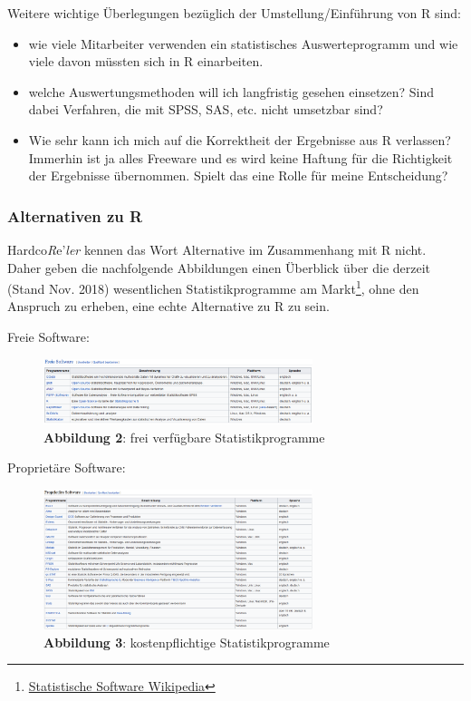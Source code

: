 \documentclass[]{article}
\providecommand{\tightlist}{%
  \setlength{\itemsep}{0pt}\setlength{\parskip}{0pt}}
\let\rmarkdownfootnote\footnote%
\def\footnote{\protect\rmarkdownfootnote}
\begin{document}
Weitere wichtige Überlegungen bezüglich der Umstellung/Einführung von R
sind:

\begin{itemize}
\tightlist
\item
  wie viele Mitarbeiter verwenden ein statistisches Auswerteprogramm und
  wie viele davon müssten sich in R einarbeiten.
\item
  welche Auswertungsmethoden will ich langfristig gesehen einsetzen?
  Sind dabei Verfahren, die mit SPSS, SAS, etc. nicht umsetzbar sind?
\item
  Wie sehr kann ich mich auf die Korrektheit der Ergebnisse aus R
  verlassen? Immerhin ist ja alles Freeware und es wird keine Haftung
  für die Richtigkeit der Ergebnisse übernommen. Spielt das eine Rolle
  für meine Entscheidung?
\end{itemize}

\subsubsection*{Alternativen zu R}\label{alternativen-zu-r}

Hardco\emph{R}e'\emph{ler} kennen das Wort Alternative im Zusammenhang
mit R nicht. Daher geben die nachfolgende Abbildungen einen Überblick
über die derzeit (Stand Nov. 2018) wesentlichen Statistikprogramme am
Markt\footnote{\href{https://de.wikipedia.org/wiki/Liste_von_Statistik-Software}{Statistische
  Software Wikipedia}}, ohne den Anspruch zu erheben, eine echte
Alternative zu R zu sein.

Freie Software:

\begin{figure}
\centering
\includegraphics[width=0.70000\textwidth]{Images/FreieStatProgs.PNG}
\caption{\textbf{Abbildung 2}: frei verfügbare Statistikprogramme}
\end{figure}

Proprietäre Software:

\begin{figure}
\centering
\includegraphics[width=0.70000\textwidth]{Images/ProprietaereStatProgs.PNG}
\caption{\textbf{Abbildung 3}: kostenpflichtige Statistikprogramme}
\end{figure}
\end{document}
